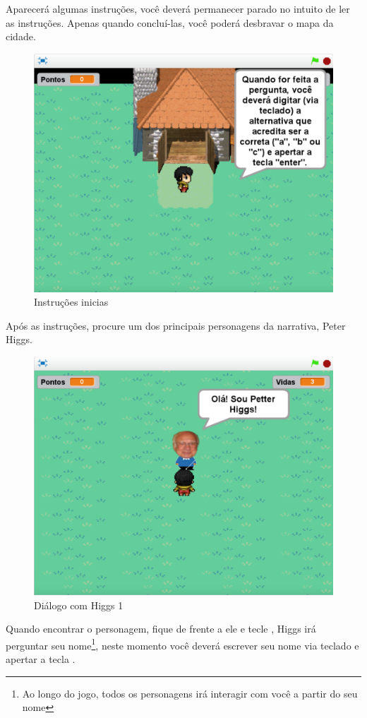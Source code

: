 \documentclass[12pt,fleqn]{book} %
\begin{document}
\newpage

Aparecerá algumas instruções, você deverá permanecer parado no intuito de ler as instruções. Apenas quando concluí-las, você poderá desbravar o mapa da cidade. 

\begin{figure}[h]
	\centering
	\includegraphics[width=0.65 \textwidth]{Produto/jogo_2}
	\caption{Instruções inicias}
	\label{fig:app_a:jogo2}
\end{figure}

Após as instruções, procure um dos principais personagens da narrativa, Peter Higgs.

\begin{figure}[h]
	\centering
	\includegraphics[width=0.65 \textwidth]{Produto/jogo_3}
	\caption{Diálogo com Higgs 1}
	\label{fig:app_a:jogo3}
\end{figure}

\newpage

Quando encontrar o personagem, fique de frente a ele e tecle , Higgs irá perguntar seu nome\footnote{Ao longo do jogo, todos os personagens irá interagir com você a partir do seu nome}, neste momento você deverá escrever seu nome via teclado e apertar a tecla .
\end{document}
